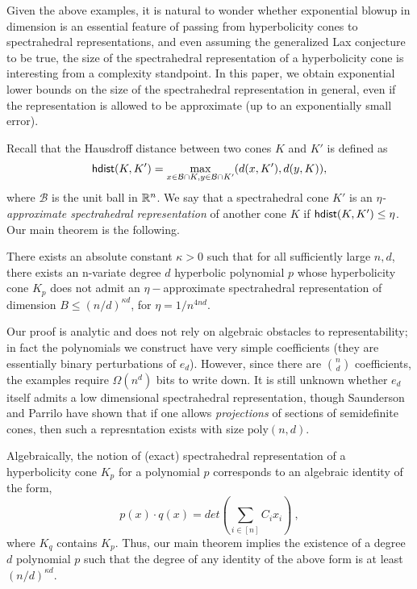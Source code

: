 Given the above examples, it is natural to wonder whether exponential
blowup in dimension is an essential feature of passing from hyperbolicity cones
to spectrahedral representations, and even assuming the generalized Lax conjecture to be
true, the size of the spectrahedral representation of a hyperbolicity cone is
interesting from a complexity standpoint. 
In this paper, we obtain exponential lower bounds on the size of the spectrahedral representation in general, even if
the representation is allowed to be approximate (up to an exponentially small error).

Recall that the Hausdroff distance between two cones
		$K$ and $K'$ is defined as $$\mathsf{hdist}(K,K') = \max_{x \in
		\mathcal{B} \cap K, y \in \mathcal{B} \cap K'} (d(x,K'),
		d(y,K)),$$ where $\mathcal{B}$ is the unit ball in $\mathbb{R}^n$.
We say that a spectrahedral cone $K'$ is  an {\em $\eta$-approximate spectrahedral representation} of another cone $K$ if
$\mathsf{hdist}(K,K')\le \eta$.
Our main theorem is the following.
\begin{theorem} \label{thm:main}
There exists an absolute constant $\kappa > 0$ such that for all sufficiently large $n, d$, 
there exists an n-variate degree $d$ hyperbolic polynomial $p$ whose hyperbolicity cone $K_p$ does not admit an $\eta-$approximate spectrahedral representation of dimension $B \leq \left(n/ d\right)^{\kappa d}$, for $\eta=1/n^{4nd}$. 
\end{theorem}

Our proof is analytic and does not rely on algebraic obstacles to
representability; in fact the polynomials we construct have very simple
coefficients (they are essentially binary perturbations of $e_d$).  However,
since there are $\binom{n}{d}$ coefficients, the examples require $\Omega(n^d)$
bits to write down. It is still unknown whether $e_d$ itself admits a low dimensional spectrahedral
representation, though Saunderson and Parrilo \cite{saunderson2015polynomial} have shown that if one allows
{\em projections} of sections of semidefinite cones, then such a represntation 
exists with size $\mathrm{poly}(n,d)$. 

Algebraically, the notion of (exact) spectrahedral representation of a
hyperbolicity cone $K_p$ for a polynomial $p$ corresponds to an algebraic
identity of the form, \[ p (x) \cdot q(x) = det ( \sum_{i \in [n]} C_i x_i) \ ,
\] where $K_q$ contains $K_p$.  Thus, our main theorem implies the existence of
a degree $d$ polynomial $p$ such that the degree of any identity of the above
form is at least $(n/d)^{\kappa d}$.


